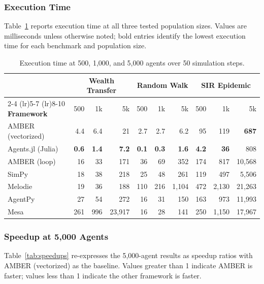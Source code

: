 \documentclass[11pt,a4paper]{article}
\begin{document}
\subsubsection{Execution Time}

Table~\ref{tab:results} reports execution time at all three tested population sizes. Values are milliseconds unless otherwise noted; bold entries identify the lowest execution time for each benchmark and population size.

\begin{table}[H]
\centering
\caption{Execution time at 500, 1{,}000, and 5{,}000 agents over 50 simulation steps.}
\label{tab:results}
\small
\begin{tabular}{l rrr rrr rrr}
\toprule
 & \multicolumn{3}{c}{\textbf{Wealth Transfer}} & \multicolumn{3}{c}{\textbf{Random Walk}} & \multicolumn{3}{c}{\textbf{SIR Epidemic}} \\
\cmidrule(lr){2-4} \cmidrule(lr){5-7} \cmidrule(lr){8-10}
\textbf{Framework} & 500 & 1k & 5k & 500 & 1k & 5k & 500 & 1k & 5k \\
\midrule
AMBER (vectorized) & 4.4 & 6.4 & 21 & 2.7 & 2.7 & 6.2 & 95 & 119 & \textbf{687} \\
Agents.jl (Julia) & \textbf{0.6} & \textbf{1.4} & \textbf{7.2} & \textbf{0.1} & \textbf{0.3} & \textbf{1.6} & \textbf{4.2} & \textbf{36} & 808 \\
AMBER (loop) & 16 & 33 & 171 & 36 & 69 & 352 & 174 & 817 & 10{,}568 \\
SimPy & 18 & 38 & 218 & 25 & 48 & 261 & 119 & 497 & 5{,}506 \\
Melodie & 19 & 36 & 188 & 110 & 216 & 1{,}104 & 472 & 2{,}130 & 21{,}263 \\
AgentPy & 27 & 54 & 272 & 16 & 31 & 150 & 163 & 973 & 11{,}993 \\
Mesa & 261 & 996 & 23{,}917 & 16 & 28 & 141 & 250 & 1{,}150 & 17{,}967 \\
\bottomrule
\end{tabular}
\end{table}

\subsubsection{Speedup at 5{,}000 Agents}

Table~\ref{tab:speedups} re-expresses the 5{,}000-agent results as speedup ratios with AMBER (vectorized) as the baseline. Values greater than 1 indicate AMBER is faster; values less than 1 indicate the other framework is faster.
\end{document}

